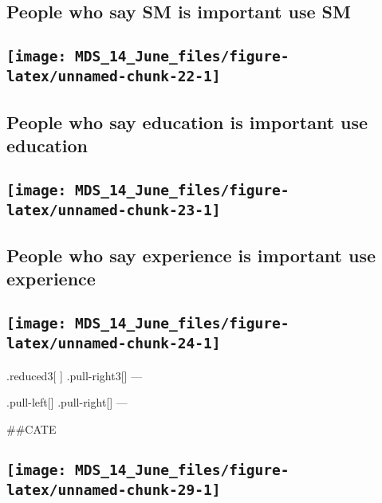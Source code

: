 \documentclass[
]{article}
\begin{document}
\hypertarget{people-who-say-sm-is-important-use-sm}{%
\subsection{People who say SM is important use
SM}\label{people-who-say-sm-is-important-use-sm}}

\hypertarget{section-8}{%
\subsection{\texorpdfstring{\texttt{[image: MDS\_14\_June\_files/figure-latex/unnamed-chunk-22-1]}}{}}\label{section-8}}

\hypertarget{people-who-say-education-is-important-use-education}{%
\subsection{People who say education is important use
education}\label{people-who-say-education-is-important-use-education}}

\hypertarget{section-9}{%
\subsection{\texorpdfstring{\texttt{[image: MDS\_14\_June\_files/figure-latex/unnamed-chunk-23-1]}}{}}\label{section-9}}

\hypertarget{people-who-say-experience-is-important-use-experience}{%
\subsection{People who say experience is important use
experience}\label{people-who-say-experience-is-important-use-experience}}

\hypertarget{section-10}{%
\subsection{\texorpdfstring{\texttt{[image: MDS\_14\_June\_files/figure-latex/unnamed-chunk-24-1]}}{}}\label{section-10}}

.reduced3{[} {]} .pull-right3{[}{]} ---

.pull-left{[}{]} .pull-right{[}{]} ---

\#\#CATE

\hypertarget{section-11}{%
\subsection{\texorpdfstring{\texttt{[image: MDS\_14\_June\_files/figure-latex/unnamed-chunk-29-1]}}{}}\label{section-11}}
\end{document}
